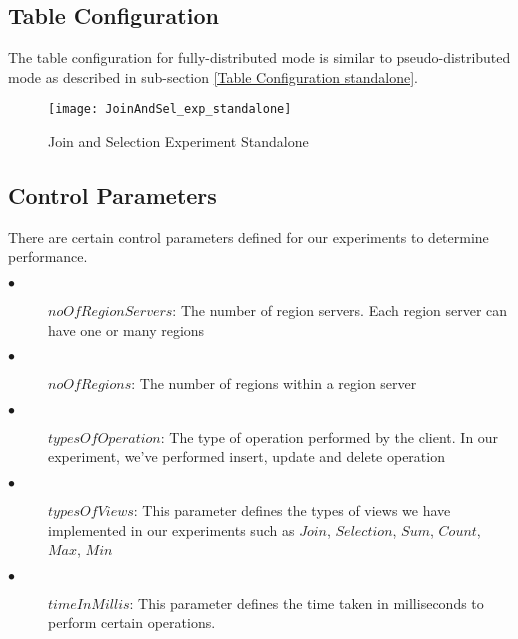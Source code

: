 \documentclass[11pt,a4paper,bibtotoc,idxtotoc,headsepline,footsepline,footexclude,BCOR12mm,DIV13]{scrbook}
\begin{document}
\subsection{Table Configuration}
The table configuration for fully-distributed mode is similar to pseudo-distributed mode as described in sub-section \ref{Table Configuration standalone}.

\begin{figure}
	\centering
	\texttt{[image: JoinAndSel\_exp\_standalone]}
	\caption{Join and Selection Experiment Standalone}
	\label{sec:JoinSelExpStandalone}
	
\end{figure} 


\subsection{Control Parameters}
\label{Control Parameter Distributed}
There are certain control parameters defined for our experiments to determine performance.

\begin{description}
	\item[$\bullet$]  $noOfRegionServers$: The number of region servers. Each region server can have one or many regions
\end{description}

\begin{description}
	\item[$\bullet$]  $noOfRegions$: The number of regions within a region server 
\end{description}

\begin{description}
	\item[$\bullet$]  $typesOfOperation$: The type of operation performed by the client. In our experiment, we've performed insert, update and delete operation 
\end{description}

\begin{description}
	\item[$\bullet$]  $typesOfViews$: This parameter defines the types of views we have implemented in our experiments such as $Join$, $Selection$, $Sum$, $Count$, $Max$, $Min$ 
\end{description}

\begin{description}
	\item[$\bullet$]  $timeInMillis$: This parameter defines the time taken in milliseconds to perform certain operations. 
\end{description}
\end{document}
